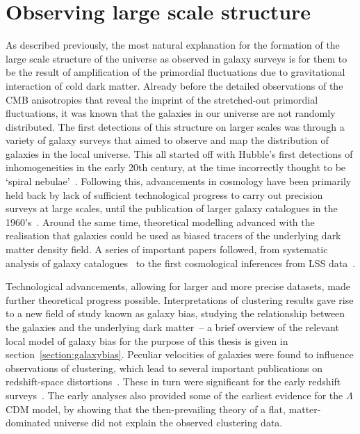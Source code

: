\section{Observing large scale structure}

As described previously, the most natural explanation for the formation of the large scale structure of the universe as observed in galaxy surveys is for them to be the result of amplification of the primordial fluctuations due to gravitational interaction of cold dark matter. Already before the detailed observations of the CMB anisotropies that reveal the imprint of the stretched-out primordial fluctuations, it was known that the galaxies in our universe are not randomly distributed. The first detections of this structure on larger scales was through a variety of galaxy surveys that aimed to observe and map the distribution of galaxies in the local universe. This all started off with Hubble's first detections of inhomogeneities in the early 20th century, at the time incorrectly thought to be `spiral nebulae'~\cite{Hubble:1926,Hubble:1934}. Following this, advancements in cosmology have been primarily held back by lack of sufficient technological progress to carry out precision surveys at large scales, until the publication of larger galaxy catalogues in the 1960's~\cite{Shane:1967,Zwicky:1961}. Around the same time, theoretical modelling advanced with the realisation that galaxies could be used as biased tracers of the underlying dark matter density field. A series of important papers followed, from systematic analysis of galaxy catalogues~\cite{Peebles:1973} to the first cosmological inferences from LSS data~\cite{Zeldovich:1970,Davis:1977mar,Davis:1977aug,Davis:1983,Peebles:1980,Maddox:1990,Baumgart:1991,Park:1992}. 

Technological advancements, allowing for larger and more precise datasets, made further theoretical progress possible. Interpretations of clustering results gave rise to a new field of study known as galaxy bias, studying the relationship between the galaxies and the underlying dark matter~\cite{Davis:1985,Rees:1985,Cole:1989vx,Kaiser:1984}-- a brief overview of the relevant local model of galaxy bias for the purpose of this thesis is given in section~\ref{section:galaxybias}. Peculiar velocities of galaxies were found to influence observations of clustering, which lead to several important publications on redshift-space distortions~\cite{Kaiser:1987qv,Davis:1983,Hamilton:1992zz}. These in turn were significant for the early redshift surveys~\cite{Cole:1994wf,Loveday:1995gk,Tadros:1999ky}. The early analyses also provided some of the earliest evidence for the $\Lambda$CDM model, by showing that the then-prevailing theory of a flat, matter-dominated universe did not explain the observed clustering data.

